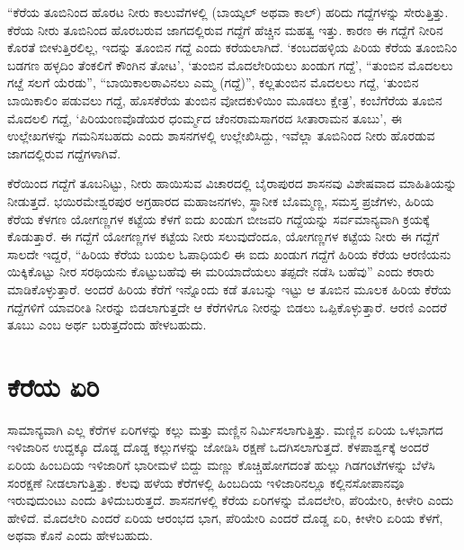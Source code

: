 “ಕೆರೆಯ ತೂಬಿನಿಂದ ಹೊರಟ ನೀರು ಕಾಲುವೆಗಳಲ್ಲಿ (ಬಾಯ್ಕಲ್​ ಅಥವಾ ಕಾಲ್​) ಹರಿದು ಗದ್ದೆಗಳನ್ನು ಸೇರುತ್ತಿತ್ತು. ಕೆರೆಯ ನೀರು ತೂಬಿನಿಂದ ಹೊರಬರುವ ಜಾಗದಲ್ಲಿರುವ ಗದ್ದೆಗೆ ಹೆಚ್ಚಿನ ಮಹತ್ವ ಇತ್ತು. ಕಾರಣ ಈ ಗದ್ದೆಗೆ ನೀರಿನ ಕೊರತೆ ಬೀಳುತ್ತಿರಲಿಲ್ಲ, ಇದನ್ನು ತೂಂಬಿನ ಗದ್ದೆ ಎಂದು ಕರೆಯಲಾಗಿದೆ. ‘ಕಂಬದಹಳ್ಳಿಯ ಪಿರಿಯ ಕೆರೆಯ ತೂಂಬಿನಿಂ ಬಡಗಣ ಹಳ್ಳದಿಂ ತೆಂಕಲಿಗೆ ಕೌಂಗಿನ ತೋಟ’, ‘ತುಂಬಿನ ಮೊದಲೇರಿಯಲು ಖಂಡುಗ ಗದ್ದೆ’, “ತುಂಬಿನ ಮೊದಲಲು ಗೞ್ದೆ ಸಲಗೆ ಯೆರಡು”, “ಬಾಯಿಕಾಲಠಾವಿನಲು ಎಮ್ಮ (ಗದ್ದೆ)”, ಕಲ್ಲತುಂಬಿನ ಮೊದಲಲು ಗದ್ದೆ, ‘ತುಂಬಿನ ಬಾಯಿಕಾಲಿಂ ಪಡುವಲು ಗದ್ದೆ, ಹೊಸಕೆರೆಯ ತುಂಬಿನ ವೋದಕುಳಿಯಿಂ ಮೂಡಲು ಕ್ಷೇತ್ರ’, ಕಂಬೆಗೆರೆಯ ತೂಬಿನ ಮೊದಲಲಿ ಗದ್ದೆ,  ‘ಪಿರಿಯಂಣವೊಡೆಯರ ಧಂರ್ಮ್ಮದ ಚೆಂನರಾಮಸಾಗರದ ಸೀತಾರಾಮನ ತೂಬು’, ಈ ಉಲ್ಲೇಖಗಳನ್ನು ಗಮನಿಸಬಹದು ಎಂದು ಶಾಸನಗಳಲ್ಲಿ ಉಲ್ಲೇಖಿಸಿದ್ದು, ಇವೆಲ್ಲಾ ತೂಬಿನಿಂದ ನೀರು ಹೊರಡುವ ಜಾಗದಲ್ಲಿರುವ ಗದ್ದೆಗಳಾಗಿವೆ. 

ಕೆರೆಯಿಂದ ಗದ್ದೆಗೆ ತೂಬನಿಟ್ಟು, ನೀರು ಹಾಯಿಸುವ ವಿಚಾರದಲ್ಲಿ ಬೈರಾಪುರದ ಶಾಸನವು ವಿಶೇಷವಾದ ಮಾಹಿತಿಯನ್ನು ನೀಡುತ್ತದೆ. ಭಯಿರಮೇಶ್ವರಪುರ ಅಗ್ರಹಾರದ ಮಹಾಜನಗಳು, ಸ್ಥಾನೀಕ ಬೊಮ್ಮಣ್ಣ, ಸಮಸ್ತ ಪ್ರಜೆಗಳು, ಹಿರಿಯ ಕೆರೆಯ ಕೆಳಗಣ ಯೋಗಣ್ಣಗಳ ಕಟ್ಟೆಯ ಕೆಳಗೆ ಐದು ಖಂಡುಗ ಬೀಜವರಿ ಗದ್ದೆಯನ್ನು ಸರ್ವಮಾನ್ಯವಾಗಿ ಕ್ರಯಕ್ಕೆ ಕೊಡುತ್ತಾರೆ. ಈ ಗದ್ದೆಗೆ ಯೋಗಣ್ಣಗಳ ಕಟ್ಟೆಯ ನೀರು ಸಲುವುದೆಂದೂ, ಯೋಗಣ್ಣಗಳ ಕಟ್ಟೆಯ ನೀರು ಈ ಗದ್ದೆಗೆ ಸಾಲದೇ ಇದ್ದರೆ, “ಹಿರಿಯ ಕೆರೆಯ ಬಯಲ ಓಪಾಧಿಯಲಿ ಈ ಐದು ಖಂಡುಗ ಗದ್ದೆಗೆ ಹಿರಿಯ ಕೆರೆಯ ಆರಣಿಯನು ಯಿಕ್ಕಿಕೊಟ್ಟು ನೀರ ಸರಥಿಯನು ಕೊಟ್ಟುಬಹೆವು ಈ ಮರಿಯಾದೆಯಲು ತಪ್ಪದೇ ನಡೆಸಿ ಬಹೆವು” ಎಂದು ಕರಾರು ಮಾಡಿಕೊಳ್ಳುತ್ತಾರೆ. ಅಂದರೆ ಹಿರಿಯ ಕೆರೆಗೆ ಇನ್ನೊಂದು ಕಡೆ ತೂಬನ್ನು ಇಟ್ಟು ಆ ತೂಬಿನ ಮೂಲಕ ಹಿರಿಯ ಕೆರೆಯ ಗದ್ದೆಗಳಿಗೆ ಯಾವರೀತಿ ನೀರನ್ನು ಬಿಡಲಾಗುತ್ತದೇ ಆ ಕೆರೆಗಳಿಗೂ ನೀರನ್ನು ಬಿಡಲು ಒಪ್ಪಿಕೊಳ್ಳುತ್ತಾರೆ. ಆರಣಿ ಎಂದರೆ ತೂಬು ಎಂಬ ಅರ್ಥ ಬರುತ್ತದೆಂದು ಹೇಳಬಹುದು.


\section{ಕೆರೆಯ ಏರಿ}

ಸಾಮಾನ್ಯವಾಗಿ ಎಲ್ಲ ಕೆರೆಗಳ ಏರಿಗಳನ್ನು ಕಲ್ಲು ಮತ್ತು ಮಣ್ಣಿನ ನಿರ್ಮಿಸಲಾಗುತ್ತಿತ್ತು. ಮಣ್ಣಿನ ಏರಿಯ ಒಳಭಾಗದ ಇಳಿಜಾರಿನ ಉದ್ದಕ್ಕೂ ದೊಡ್ಡ ದೊಡ್ಡ ಕಲ್ಲುಗಳನ್ನು ಜೋಡಿಸಿ ರಕ್ಷಣೆ ಒದಗಿಸಲಾಗುತ್ತದೆ. ಕೆಳಪಾರ್ಶ್ವಕ್ಕೆ ಅಂದರೆ ಏರಿಯ ಹಿಂಬದಿಯ ಇಳಿಜಾರಿಗೆ ಭಾರೀಮಳೆ ಬಿದ್ದು ಮಣ್ಣು ಕೊಚ್ಚಿಹೋಗದಂತೆ ಹುಲ್ಲು ಗಿಡಗಂಟೆಗಳನ್ನು ಬೆಳೆಸಿ ಸಂರಕ್ಷಣೆ ನೀಡಲಾಗುತ್ತಿತ್ತು. ಕೆಲವು ಹಳೆಯ ಕೆರೆಗಳಲ್ಲಿ ಹಿಂಬದಿಯ ಇಳಿಜಾರಿನಲ್ಲೂ ಕಲ್ಲಿನಸೋಪಾನವೂ ಇರುವುದುಂಟು ಎಂದು ತಿಳಿದುಬರುತ್ತದೆ. ಶಾಸನಗಳಲ್ಲಿ ಕೆರೆಯ ಏರಿಗಳನ್ನು ಮೊದಲೇರಿ, ಪೆರಿಯೇರಿ, ಕೀಳೇರಿ ಎಂದು ಹೇಳಿದೆ. ಮೊದಲೇರಿ ಎಂದರೆ ಏರಿಯ ಆರಂಭದ ಭಾಗ, ಪೆರಿಯೇರಿ ಎಂದರೆ ದೊಡ್ಡ ಏರಿ, ಕೀಳೇರಿ ಏರಿಯ ಕೆಳಗೆ, ಅಥವಾ ಕೊನೆ ಎಂದು ಹೇಳಬಹುದು.

